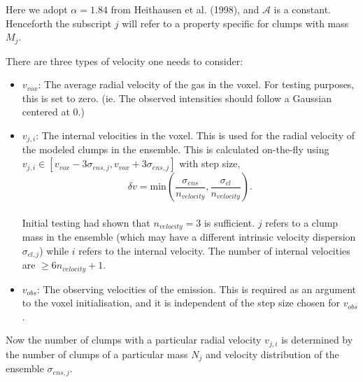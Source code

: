 \documentclass[a4paper]{article}
\newcommand{\kosmatau}{KOSMA-\(\tau\)}
\begin{document}
    Here we adopt \(\alpha=1.84\) from Heithausen et al. (1998), and \(\mathcal{A}\) is a constant.
    Henceforth the subscript \(j\) will refer to a property specific for clumps with mass \(M_j\).

    There are three types of velocity one needs to consider:

    \begin{itemize}
        \item \(v_{vox}\): The average radial velocity of the gas in the voxel. For testing purposes, this is set to zero. (ie. The observed intensities should follow a Gaussian centered at 0.)
        \item \(v_{j,i}\): The internal velocities in the voxel. This is used for the radial velocity of the modeled clumps in the ensemble. This is calculated on-the-fly using \(v_{j,i} \in [v_{vox} - 3 \sigma_{ens,j}, v_{vox} + 3 \sigma_{ens,j}]\) with step size, \\
        \[\delta v = \mathrm{min} \left( \frac{\sigma_{ens}}{n_{velocity}}, \frac{\sigma_{cl}}{n_{velocity}} \right).\]\\
         Initial testing had shown that \(n_{velocity} = 3\) is sufficient. \(j\) refers to a clump mass in the ensemble (which may have a different intrinsic velocity dispersion \(\sigma_{cl,j}\)) while \(i\) refers to the internal velocity. The number of internal velocities are \(\geq 6 n_{velocity} + 1\).
        \item \(v_{obs}\): The observing velocities of the emission. This is required as an argument to the voxel initialisation, and it is independent of the step size chosen for \(v_{obs}\).
    \end{itemize}

    Now the number of clumps with a particular radial velocity \(v_{j,i}\) is determined by the number of clumps of a particular mass \(N_j\) and velocity distribution of the ensemble \(\sigma_{ens,j}\).
\end{document}

